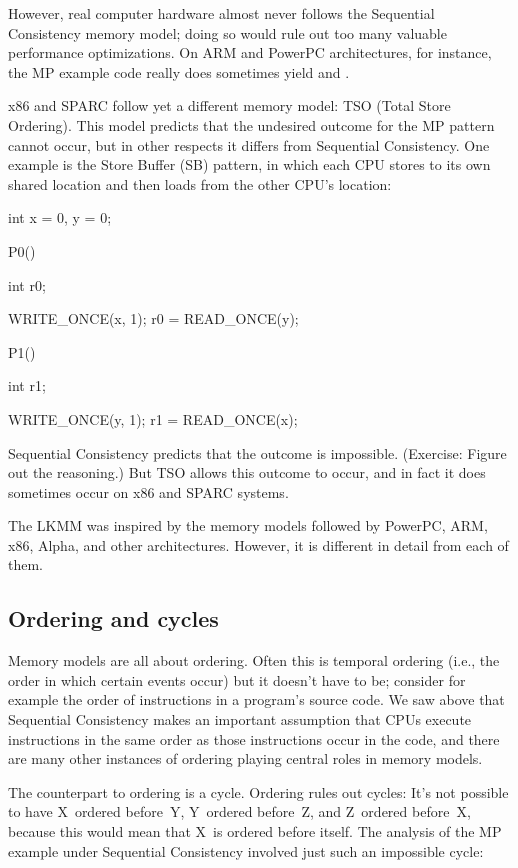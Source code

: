 However, real computer hardware almost never follows the Sequential
Consistency memory model; doing so would rule out too many valuable
performance optimizations.
On ARM and PowerPC architectures, for instance, the MP example code
really does sometimes yield  and .

x86 and SPARC follow yet a different memory model:
TSO (Total Store Ordering).
This model predicts that the undesired outcome for the MP pattern
cannot occur, but in other respects it differs from Sequential
Consistency.
One example is the Store Buffer (SB) pattern, in which each CPU
stores to its own shared location and then loads from the other CPU's
location:

\begin{VerbatimU}
	int x = 0, y = 0;

	P0()
	{
		int r0;

		WRITE_ONCE(x, 1);
		r0 = READ_ONCE(y);
	}

	P1()
	{
		int r1;

		WRITE_ONCE(y, 1);
		r1 = READ_ONCE(x);
	}
\end{VerbatimU}

Sequential Consistency predicts that the outcome  is
impossible.
(Exercise:
Figure out the reasoning.)
But TSO allows this outcome to occur, and in fact it does sometimes
occur on x86 and SPARC systems.

The LKMM was inspired by the memory models followed by PowerPC, ARM,
x86, Alpha, and other architectures.
However, it is different in detail from each of them.


\subsection{Ordering and cycles}
\label{sec:docs:explanation:Ordering and cycles}

Memory models are all about ordering.
Often this is temporal ordering (i.e., the order in which certain
events occur) but it doesn't have to be; consider for example the
order of instructions in a program's source code.
We saw above that Sequential Consistency makes an important assumption
that CPUs execute instructions in the same order as those instructions
occur in the code, and there are many other instances of ordering
playing central roles in memory models.

The counterpart to ordering is a cycle.
Ordering rules out cycles:
It's not possible to have X~ordered before~Y, Y~ordered before~Z, and
Z~ordered before~X, because this would mean that X~is ordered before
itself.
The analysis of the MP example under Sequential Consistency involved
just such an impossible cycle:

